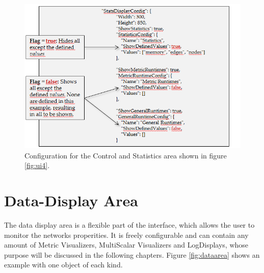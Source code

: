 \begin{figure} [h]
\centering
\includegraphics [scale=0.8] {images/ui5}
\caption{Configuration for the Control and Statistics area shown in figure \ref{fig:ui4}.}
\label{fig:ui5}
\end{figure}

\section{Data-Display Area}
The data display area is a flexible part of the interface, which allows the user to monitor the networks properities. It is freely configurable and can contain any amount of Metric Visualizers, MultiScalar Visualizers and LogDisplays,  whose purpose will be discussed in the following chapters. Figure \ref{fig:dataarea} shows an example with one object of each kind.

